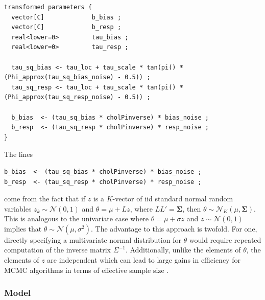 \begin{singlespacing}
\small
\begin{verbatim}
transformed parameters {
  vector[C]             b_bias ;
  vector[C]             b_resp ;
  real<lower=0>         tau_bias ;
  real<lower=0>         tau_resp ;

  tau_sq_bias <- tau_loc + tau_scale * tan(pi() * (Phi_approx(tau_sq_bias_noise) - 0.5)) ;
  tau_sq_resp <- tau_loc + tau_scale * tan(pi() * (Phi_approx(tau_sq_resp_noise) - 0.5)) ;

  b_bias  <- (tau_sq_bias * cholPinverse) * bias_noise ;
  b_resp  <- (tau_sq_resp * cholPinverse) * resp_noise ;
}
\end{verbatim}
\end{singlespacing}

\noindent The lines
%
\begin{singlespacing}
\small
\begin{verbatim}
b_bias  <- (tau_sq_bias * cholPinverse) * bias_noise ; 
b_resp  <- (tau_sq_resp * cholPinverse) * resp_noise ; 
\end{verbatim}
\end{singlespacing}

\noindent come from the fact that if $z$ is a $K$-vector of iid standard normal random variables $z_k \sim \mathcal{N}(0,1)$ and $\theta = \mu + L z$, where $LL' = \boldsymbol{\Sigma}$, then $\theta \sim \mathcal{N}_K (\mu, \boldsymbol{\Sigma})$. This is analogous to the univariate case where $\theta = \mu + \sigma z$ and $z \sim \mathcal{N}(0,1)$ implies that $\theta \sim \mathcal{N}(\mu, \sigma^2)$. The advantage to this approach is twofold. For one, directly specifying a multivariate normal distribution for $\theta$ would require repeated computation of the inverse matrix $\Sigma^{-1}$. Additionally, unlike the elements of $\theta$, the elements of $z$ are independent which can lead to large gains in efficiency for MCMC algorithms in terms of effective sample size . 

\subsubsection{Model}

